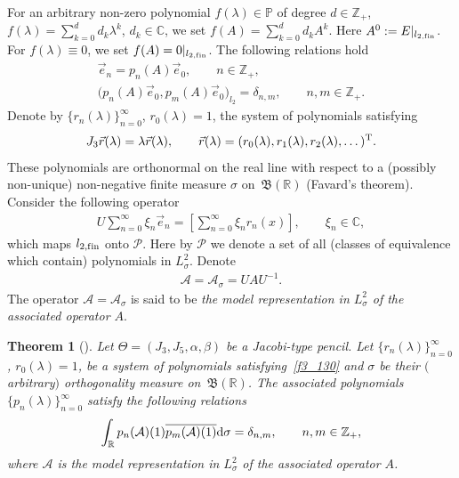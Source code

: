 \documentclass[11pt]{article}
\numberwithin{equation}{section}
\newtheorem{Theorem}{Theorem}[section]
\begin{document}
For an arbitrary non-zero polynomial $f(\lambda)\in\mathbb{P}$ of degree $d\in\mathbb{Z}_+$, $f(\lambda) = \sum\limits_{k=0}^d d_k \lambda^k$, $d_k\in\mathbb{C}$, we set $f(A) = \sum\limits_{k=0}^d d_k A^k$. Here $A^0 := E|_{l_{2,{\rm f\/in}}}$. For $f(\lambda) \equiv 0$, we set $f(A) = 0|_{l_{2,{\rm f\/in}}}$. The following relations hold~\cite{cit_95000_Z}
\begin{gather}\label{f3_110}
\vec e_n = p_n(A) \vec e_0,\qquad n\in\mathbb{Z}_+,\\
\label{f3_120} \big( p_n(A) \vec e_0, p_m(A) \vec e_0 \big)_{l_2} = \delta_{n,m},\qquad n,m\in\mathbb{Z}_+.
\end{gather}
Denote by $\{ r_n(\lambda) \}_{n=0}^\infty$, $r_0(\lambda) = 1$, the system of polynomials satisfying
\begin{gather}
\label{f3_130}
J_3 \vec r(\lambda) = \lambda \vec r(\lambda),\qquad \vec r(\lambda) = (r_0(\lambda), r_1(\lambda),r_2(\lambda), \dots )^{\rm T}.
\end{gather}
These polynomials are orthonormal on the real line with respect to a (possibly non-unique) non-negative f\/inite measure $\sigma$ on~$\mathfrak{B}(\mathbb{R})$ (Favard's theorem). Consider the following operator
\begin{gather}\label{f3_140}
U \sum_{n=0}^\infty \xi_n \vec e_n = \left[ \sum_{n=0}^\infty \xi_n r_n(x) \right ],\qquad \xi_n\in\mathbb{C},
\end{gather}
which maps $l_{2,{\rm f\/in}}$ onto $\mathcal{P}$. Here by $\mathcal{P}$ we denote a set of all (classes of equivalence which contain) polynomials in $L^2_\sigma$. Denote
\begin{gather} \label{f3_150}
\mathcal{A} = \mathcal{A}_\sigma = U A U^{-1}.
\end{gather}
The operator $\mathcal{A} = \mathcal{A}_\sigma$ is said to be \textit{the model representation in $L^2_\sigma$ of the associated operator $A$}.

\begin{Theorem}[\cite{cit_95000_Z}]\label{t3_1} Let $\Theta = (J_3, J_5, \alpha, \beta)$ be a Jacobi-type pencil. Let $\{ r_n(\lambda) \}_{n=0}^\infty$, $r_0(\lambda) = 1$, be a system of polynomials satisfying~\eqref{f3_130} and $\sigma$ be their $($arbitrary$)$ orthogonality measure on~$\mathfrak{B}(\mathbb{R})$. The associated polynomials $\{ p_n(\lambda) \}_{n=0}^\infty$ satisfy the following relations
\begin{gather}\label{f3_160}
\int_{\mathbb{R}} p_n(\mathcal{A})(1) \overline{ p_m(\mathcal{A})(1) } {\rm d}\sigma = \delta_{n,m},\qquad n,m\in\mathbb{Z}_+,
\end{gather}
where $\mathcal{A}$ is the model representation in $L^2_\sigma$ of the associated operator $A$.
\end{Theorem}
\end{document}
